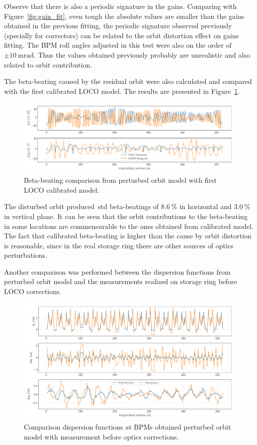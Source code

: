Observe that there is also a periodic signature in the gains. Comparing with Figure~\ref{fig:gain_fit}, even tough the absolute values are smaller than the gains obtained in the previous fitting, the periodic signature observed previously (specially for correctors) can be related to the orbit distortion effect on gains fitting. The BPM roll angles adjusted in this test were also on the order of $\pm\SI{10}{\milli\radian}$. Thus the values obtained previously probably are unrealistic and also related to orbit contribution.

The beta-beating caused by the residual orbit were also calculated and compared with the first calibrated LOCO model. The results are presented in Figure~\ref{fig:beta_beating_orb}.
\begin{figure}[h!]
\centering
\includegraphics[width=1.0\textwidth]{figures/beta_beating_orbit_loco_iter0.pdf}
\caption{Beta-beating comparison from perturbed orbit model with first LOCO calibrated model.}
\label{fig:beta_beating_orb}
\end{figure}

The disturbed orbit produced~\gls{std} beta-beatings of $\SI{8.6}{\%}$ in horizontal and $\SI{3.0}{\%}$ in vertical plane. It can be seen that the orbit contributions to the beta-beating in some locations are commensurable to the ones obtained from calibrated model. The fact that calibrated beta-beating is higher than the cause by orbit distortion is reasonable, since in the real storage ring there are other sources of optics perturbations. 

Another comparison was performed between the dispersion functions from perturbed orbit model and the measurements realized on storage ring before LOCO corrections.
\begin{figure}[h!]
\centering
\includegraphics[width=1.0\textwidth]{figures/dispersion_orbit_iter0.pdf}
\caption{Comparison dispersion functions at BPMs obtained perturbed orbit model with measurement before optics corrections.}
\label{fig:disperson_orb}
\end{figure}

